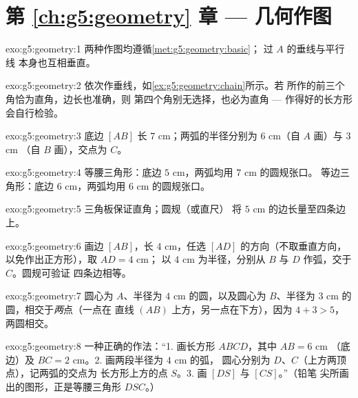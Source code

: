 \section*{第 \ref{ch:g5:geometry} 章 --- 几何作图}

\begin{solution}{exo:g5:geometry:1}
两种作图均遵循\cref{met:g5:geometry:basic}；
过 $A$ 的垂线与平行线
本身也互相垂直。
\end{solution}

\begin{solution}{exo:g5:geometry:2}
依次作垂线，如\cref{ex:g5:geometry:chain}所示。若
所作的前三个角恰为直角，边长也准确，则
第四个角别无选择，也必为直角 ---
作得好的长方形会自行检验。
\end{solution}

\begin{solution}{exo:g5:geometry:3}
底边 $[AB]$ 长 $7$ cm；两弧的半径分别为 $6$ cm（自 $A$ 画）与 $3$ cm
（自 $B$ 画），交点为 $C$。
\end{solution}

\begin{solution}{exo:g5:geometry:4}
等腰三角形：底边 $5$ cm，两弧均用 $7$ cm 的圆规张口。
等边三角形：底边 $6$ cm，两弧均用 $6$ cm 的圆规张口。
\end{solution}

\begin{solution}{exo:g5:geometry:5}
三角板保证直角；圆规（或直尺）
将 $5$ cm 的边长量至四条边上。
\end{solution}

\begin{solution}{exo:g5:geometry:6}
画边 $[AB]$，长 $4$ cm，任选 $[AD]$ 的方向（不取垂直方向，
以免作出正方形），取 $AD = 4$ cm；
以 $4$ cm 为半径，分别从 $B$ 与 $D$ 作弧，交于 $C$。圆规可验证
四条边相等。
\end{solution}

\begin{solution}{exo:g5:geometry:7}
圆心为 $A$、半径为 $4$ cm 的圆，以及圆心为
$B$、半径为 $3$ cm 的圆，相交于\emph{两}点（一点在
直线 $(AB)$ 上方，另一点在下方），因为 $4 + 3 > 5$，两圆相交。
\end{solution}

\begin{solution}{exo:g5:geometry:8}
一种正确的作法：“1. 画长方形 $ABCD$，其中 $AB = 6$ cm
（底边）及 $BC = 2$ cm。2. 画两段半径为 $4$ cm 的弧，
圆心分别为 $D$、$C$（上方两顶点），记两弧的交点为
长方形上方的点 $S$。3. 画 $[DS]$ 与 $[CS]$。”（铅笔
尖所画出的图形，正是等腰三角形 $DSC$。）
\end{solution}


